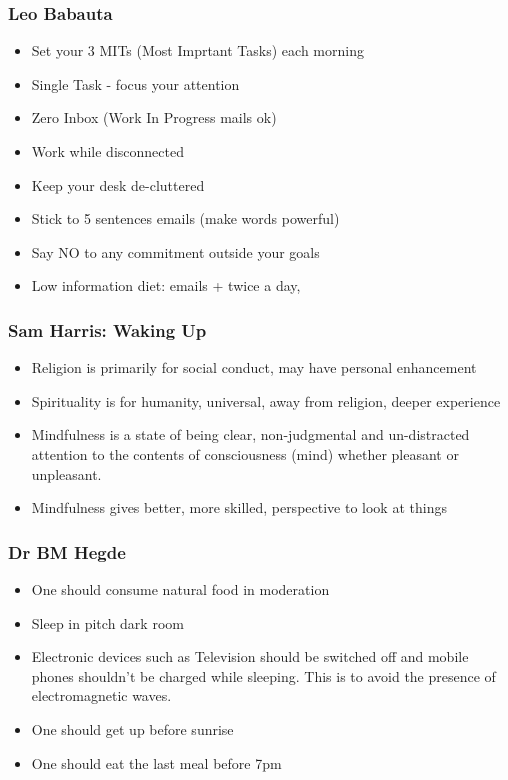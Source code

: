 \begin{frame}[fragile]\frametitle{Leo Babauta}

	\begin{itemize}
	\item Set your 3 MITs (Most Imprtant Tasks) each morning
	\item Single Task - focus your attention
	\item Zero Inbox (Work In Progress mails ok)
	\item Work while disconnected
	\item Keep your desk de-cluttered
	\item Stick to 5 sentences emails (make words powerful)
	\item Say NO to any commitment outside your goals
	\item Low information diet: emails + twice a day, 
	\end{itemize}

\end{frame}

\begin{frame}[fragile]\frametitle{Sam Harris: Waking Up}

	\begin{itemize}
	\item Religion is primarily for social conduct, may have personal enhancement
	\item Spirituality is for humanity, universal, away from religion, deeper experience
	\item Mindfulness is a state of being clear, non-judgmental and un-distracted attention to the contents of consciousness (mind) whether pleasant or unpleasant.
	\item Mindfulness gives better, more skilled, perspective to look at things
	\end{itemize}

\end{frame}


\begin{frame}[fragile]\frametitle{Dr BM Hegde}

	\begin{itemize}
	\item One should consume natural food in moderation 
	\item Sleep in pitch dark room 
	\item Electronic devices such as Television should be switched off and mobile phones shouldn’t be charged while sleeping. This is to avoid the presence of electromagnetic waves. 
	\item One should get up before sunrise 
	\item One should eat the last meal before 7pm
	\end{itemize}

\end{frame}

